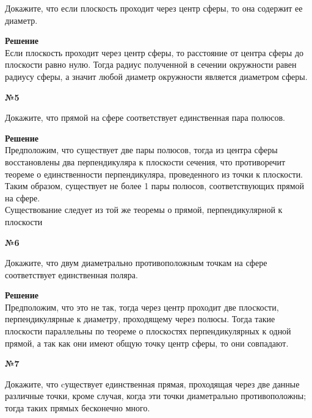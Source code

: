     Докажите, что если плоскость проходит через центр сферы, то она содержит ее диаметр.

    \textbf{Решение}\\

    Если плоскость проходит через центр сферы, то расстояние от центра сферы до плоскости равно нулю.
    Тогда радиус полученной в сечении окружности равен радиусу сферы, а значит любой диаметр окружности является диаметром сферы.

    \begin{center}
        \textbf{№5}
    \end{center}

    Докажите, что прямой на сфере соответствует единственная пара полюсов.

    \textbf{Решение}\\

    Предположим, что существует две пары полюсов, тогда из центра сферы восстановлены два перпендикуляра к плоскости сечения,
    что противоречит теореме о единственности перпендикуляра, проведенного из точки к плоскости.\\

    Таким образом, существует не более 1 пары полюсов, соответствующих прямой на сфере.\\

    Существование следует из той же теоремы о прямой, перпендикулярной к плоскости

    \begin{center}
        \textbf{№6}
    \end{center}

    Докажите, что двум диаметрально противоположным точкам на сфере соответствует единственная поляра.

    \textbf{Решение}\\

    Предположим, что это не так, тогда через центр проходит две плоскости, перпендикулярные к диаметру, проходящему через полюсы.
    Тогда такие плоскости параллельны по теореме о плоскостях перпендикулярных к одной прямой,
    а так как они имеют общую точку центр сферы, то они совпадают.

    \begin{center}
        \textbf{№7}
    \end{center}

    Докажите, что cуществует единственная прямая, проходящая через две данные различные точки,
    кроме случая, когда эти точки диаметрально противоположны;
    тогда таких прямых бесконечно много.

